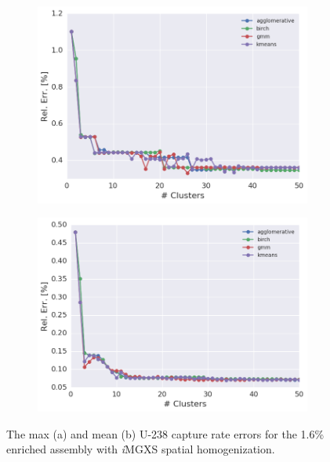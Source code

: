 \begin{figure}[h!]
\centering
\begin{subfigure}{0.9\textwidth}
  \centering
  \includegraphics[width=\linewidth]{figures/results/err-by-cluster/assm-16/max-rel-err}
  \caption{}
  \label{fig:chap11-max-capt-err-by-cluster-assm-16}
\end{subfigure}
\begin{subfigure}{0.9\textwidth}
  \centering
  \includegraphics[width=\linewidth]{figures/results/err-by-cluster/assm-16/mean-rel-err}
  \caption{}
  \label{fig:chap11-mean-capt-err-by-cluster-assm-16}
\end{subfigure}
\caption[U-238 capture rate error variation with the number of clusters]{The max (a) and mean (b) U-238 capture rate errors for the 1.6\% enriched assembly with \textit{i}\ac{MGXS} spatial homogenization.}
\label{fig:chap11-capt-err-by-cluster-assm-16}
\end{figure}

